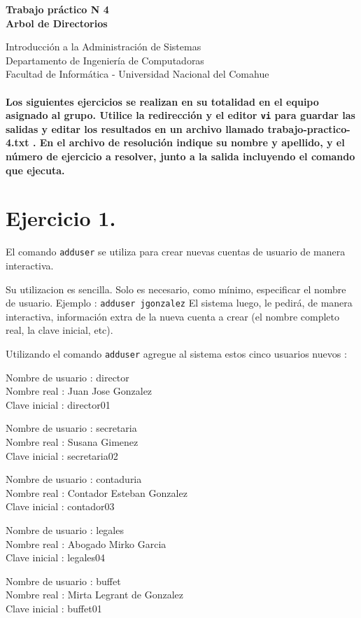 \documentclass[12pt]{article}
\def\maketitle{

 \makeatletter
 {\color{bl} \centering \huge \sc \textbf{
Trabajo práctico N 4 \\
\large \vspace*{-8pt} \color{black} Arbol de Directorios
 \vspace*{8pt} }\par}
 \makeatother


 \makeatletter
 {\centering \small 
	Introducción a la Administración de Sistemas \\
 	Departamento de Ingeniería de Computadoras \\
 	Facultad de Informática - Universidad Nacional del Comahue \\
 	\vspace{20pt} }
 \makeatother

}
\begin{document}
\thispagestyle{empty}
\maketitle
\setlength{\parindent}{0pt}

\paragraph{Los siguientes ejercicios se realizan en su totalidad en el equipo asignado al grupo.
Utilice la redirección y el editor \texttt{vi} para guardar las salidas y editar los resultados 
en un archivo llamado trabajo-practico-4.txt . En el archivo de resolución indique su nombre y apellido, y el número de ejercicio a resolver, junto a la salida incluyendo el comando que ejecuta. }

\section{Ejercicio 1.}


El comando  \texttt{adduser} se utiliza para crear nuevas cuentas de usuario de manera interactiva.

Su utilizacion es sencilla. Solo es necesario, como mínimo, especificar el nombre de usuario. Ejemplo : \texttt{adduser jgonzalez}
El sistema luego, le pedirá, de manera interactiva, información extra de la nueva cuenta a crear (el nombre completo real, la clave inicial, etc).

Utilizando el comando \texttt{adduser} agregue al sistema estos cinco usuarios nuevos :

Nombre de usuario : director \\
Nombre real : Juan Jose Gonzalez \\
Clave inicial : director01

Nombre de usuario : secretaria \\
Nombre real : Susana Gimenez \\
Clave inicial : secretaria02

Nombre de usuario : contaduria \\
Nombre real : Contador Esteban Gonzalez \\
Clave inicial : contador03

Nombre de usuario : legales \\
Nombre real : Abogado Mirko Garcia  \\
Clave inicial : legales04

Nombre de usuario : buffet \\
Nombre real : Mirta Legrant de Gonzalez \\
Clave inicial : buffet01
\end{document}
